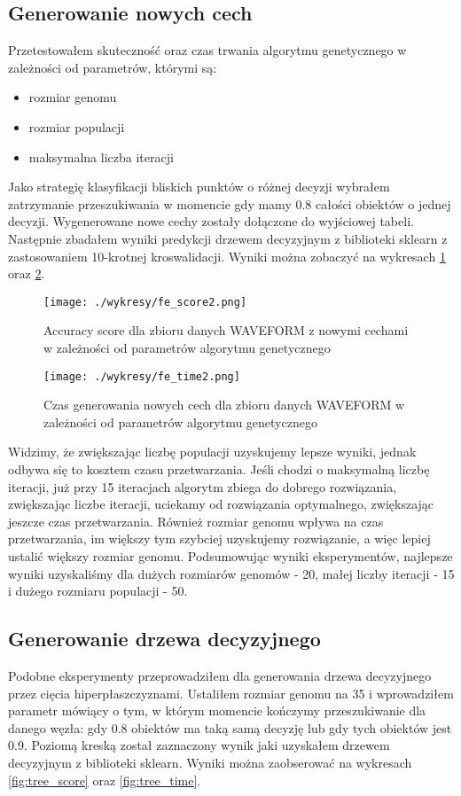 \documentclass[magisterska]{pracamgr}
\theoremstyle{plain}
\theoremstyle{definition}
\theoremstyle{remark}
\begin{document}
\subsection{Generowanie nowych cech}
Przetestowałem skuteczność oraz czas trwania algorytmu genetycznego w zależności od parametrów, którymi są:
  \begin{itemize}
   \item rozmiar genomu
   \item rozmiar populacji
   \item maksymalna liczba iteracji
  \end{itemize}
Jako strategię klasyfikacji bliskich punktów o różnej decyzji wybrałem zatrzymanie przeszukiwania w momencie gdy mamy 
0.8 całości obiektów o jednej decyzji. Wygenerowane nowe cechy zostały dołączone do wyjściowej tabeli. Następnie zbadałem
wyniki predykcji drzewem decyzyjnym z biblioteki sklearn z zastosowaniem 10-krotnej kroswalidacji.
Wyniki można zobaczyć na wykresach \ref{fig:fe_score} oraz \ref{fig:fe_time}.

\begin{figure}
 \caption{Accuracy score dla zbioru danych WAVEFORM z nowymi cechami w zależności od parametrów algorytmu genetycznego}\label{fig:fe_score}
 \centering\texttt{[image: ./wykresy/fe\_score2.png]}
\end{figure}

\begin{figure}
 \caption{Czas generowania nowych cech dla zbioru danych WAVEFORM w zależności od parametrów algorytmu genetycznego}\label{fig:fe_time}
 \centering\texttt{[image: ./wykresy/fe\_time2.png]}
\end{figure}

Widzimy, że zwiększając liczbę populacji uzyskujemy lepsze wyniki, jednak odbywa się to kosztem
czasu przetwarzania. Jeśli chodzi o maksymalną liczbę iteracji, już przy 15 iteracjach algorytm zbiega do 
dobrego rozwiązania, zwiększając liczbe iteracji, uciekamy od rozwiązania optymalnego, zwiększając jeszcze 
czas przetwarzania. Również rozmiar genomu wpływa na czas przetwarzania, im większy tym szybciej
uzyskujemy rozwiązanie, a więc lepiej ustalić większy rozmiar genomu. Podsumowując wyniki eksperymentów, najlepsze
wyniki uzyskaliśmy dla dużych rozmiarów genomów - 20, małej liczby iteracji - 15 i dużego rozmiaru populacji - 50.

\subsection{Generowanie drzewa decyzyjnego}
Podobne eksperymenty przeprowadziłem dla generowania drzewa decyzyjnego przez cięcia hiperpłaszczyznami.
Ustaliłem rozmiar genomu na 35 i wprowadziłem parametr mówiący o tym, w którym momencie kończymy przeszukiwanie
dla danego węzła: gdy 0.8 obiektów ma taką samą decyzję lub gdy tych obiektów jest 0.9.
Poziomą kreską został zaznaczony wynik jaki uzyskałem drzewem decyzyjnym z biblioteki sklearn.
Wyniki można zaobserować na wykresach \ref{fig:tree_score} oraz \ref{fig:tree_time}.
\end{document}
